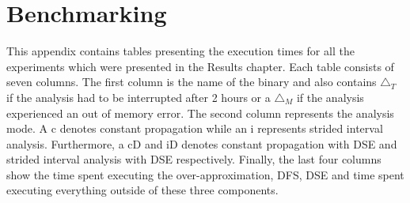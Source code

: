 \documentclass{kththesis}
\begin{document}
\appendix
\chapter{Benchmarking}
This appendix contains tables presenting the execution times for all the experiments which were presented in the Results chapter. Each table consists of seven columns. The first column is the name of the binary and also contains $\triangle_{T}$ if the analysis had to be interrupted after 2 hours or a $\triangle_{M}$ if the analysis experienced an out of memory error. The second column represents the analysis mode. A c denotes constant propagation while an i represents strided interval analysis. Furthermore, a cD and iD denotes constant propagation with DSE and strided interval analysis with DSE respectively. Finally, the last four columns show the time spent executing the over-approximation, DFS, DSE and time spent executing everything outside of these three components.
\\ \\
\end{document}
